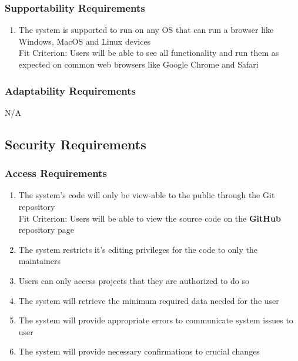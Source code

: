 \documentclass[12pt, titlepage]{article}
\begin{document}
	\subsubsection{Supportability Requirements}
	\begin{enumerate}[resume*]
		\item The system is supported to run on any OS that can run a browser like Windows, MacOS and Linux devices\\
		{\color{red}Fit Criterion: Users will be able to see all functionality and run them as expected on common web browsers like Google Chrome and Safari}
	\end{enumerate}
	\subsubsection{Adaptability Requirements}
	N/A
	\subsection{Security Requirements}
	\subsubsection{Access Requirements}
	\begin{enumerate}[resume*]
		\item The system’s code will only be view-able to the public through the Git repository \\
		{\color{red}Fit Criterion: Users will be able to view the source code on the \textbf{GitHub} repository page}
		\item The system restricts it's editing privileges for the code to only the maintainers\\
		\item Users can only access projects that they are authorized to do so
		\item The system will retrieve the minimum required data needed for the user
		\item The system will provide appropriate errors to communicate system issues to user
		\item The system will provide necessary confirmations to crucial changes
	\end{enumerate}
	
\end{document}
